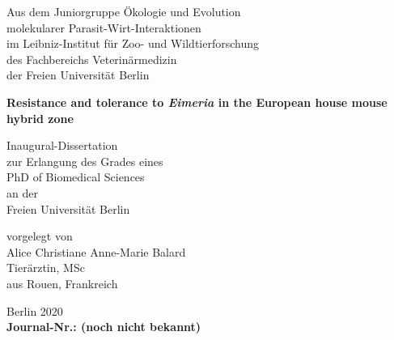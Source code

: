\begin{titlepage}
    \begin{center}
        Aus dem Juniorgruppe Ökologie und Evolution \\
        molekularer Parasit-Wirt-Interaktionen \\
        im Leibniz-Institut für Zoo- und Wildtierforschung \\
        des Fachbereichs Veterinärmedizin \\
        der Freien Universität Berlin
        
        \vfill
        \textbf{{\Large Resistance and tolerance to \textit{Eimeria} in the European house mouse hybrid zone}}
 
       \vfill
 
        Inaugural-Dissertation \\
        zur Erlangung des Grades eines \\
        PhD of Biomedical Sciences \\
        an der \\
        Freien Universität Berlin
 
        \vfill

        vorgelegt von \\
        Alice Christiane Anne-Marie Balard \\
        Tierärztin, MSc \\
        aus Rouen, Frankreich
        
        \vfill
        
        Berlin 2020 \\
        \textbf{Journal-Nr.: (noch nicht bekannt)}

 
   \end{center}
\end{titlepage}
